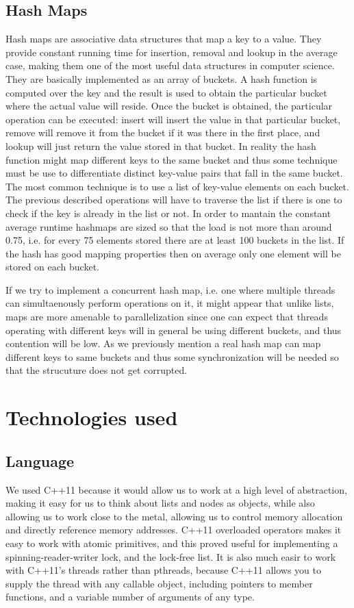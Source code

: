 \documentclass[11pt]{article}
\begin{document}
\subsection{Hash Maps} \label{ssec:bgmap}
Hash maps are associative data structures that map a
key to a value. They provide constant running time for insertion, removal and lookup in the
average case, making them one of the most useful data structures in computer
science. They are basically implemented as an array of buckets. A hash function
is computed over the key and the result is used to obtain the particular bucket
where the actual value will reside. Once the bucket is obtained, the particular
operation can be executed: insert will insert the value in that particular
bucket, remove will remove it from the bucket if it was there in the first
place,  and lookup will just return the value stored in that bucket. In reality
the hash function might map different keys to the same bucket and thus some
technique must be use to differentiate distinct key-value pairs that fall in the
same bucket. The most common technique is to use a list of key-value elements on
each bucket. The previous described operations will have to traverse the list if
there is one to check if the key is already in the list or not. In order to
mantain the constant average runtime hashmaps are sized so that the load is not
more than around 0.75, i.e. for every 75 elements stored there are at least 100 buckets
in the list. If the hash has good mapping properties then on average only one
element will be stored on each bucket.

If we try to implement a concurrent hash map, i.e. one where multiple
threads can simultaenously perform operations on it, it might appear that
unlike lists, maps are more amenable to parallelization since one can expect that
threads operating with different keys will in general be using different buckets, and
thus contention will be low.
As we previously mention a real hash map can map different keys to same buckets
and thus some synchronization will be needed so that the strucuture does not get
corrupted.

\section{Technologies used}
\subsection{Language}
We used C++11 because it would allow us to work at a high level of abstraction,
making it easy for us to think about lists and nodes as objects, while also
allowing us to work close to the metal, allowing us to control memory allocation
and directly reference memory addresses. C++11 overloaded operators makes it
easy to work with atomic primitives, and this proved useful for implementing a
spinning-reader-writer lock, and the lock-free list. It is also much easir to
work with C++11's threads rather than pthreads, because C++11 allows you to
supply the thread with any callable object, including pointers to member
functions, and a variable number of arguments of any type.
\end{document}
